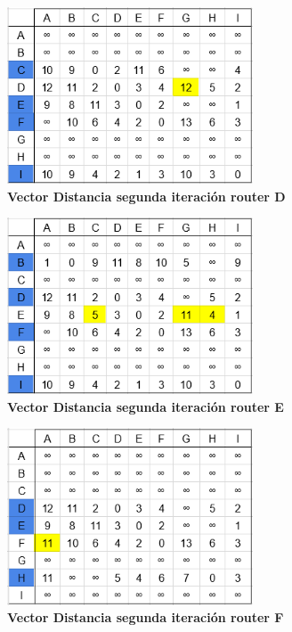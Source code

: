 \documentclass[12pt]{article}
\begin{document}
\begin{figure}[H] 
\centering 
\includegraphics[width=0.65\textwidth]{imagenes/2D2.png} \caption{\small \textbf{Vector Distancia segunda iteración router D}}
\label{fig:diagrama_29} 
\end{figure}
\begin{figure}[H] 
\centering 
\includegraphics[width=0.65\textwidth]{imagenes/2E2.png} \caption{\small \textbf{Vector Distancia segunda iteración router E}}
\label{fig:diagrama_30} 
\end{figure}
\begin{figure}[H] 
\centering 
\includegraphics[width=0.65\textwidth]{imagenes/2F2.png} \caption{\small \textbf{Vector Distancia segunda iteración router F}}
\label{fig:diagrama_31} 
\end{figure}
\end{document}
